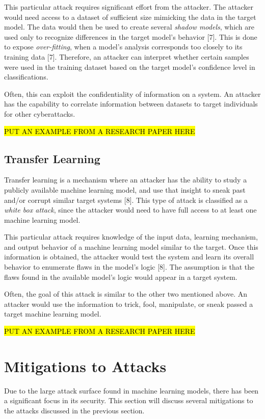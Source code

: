 \documentclass[11pt,conference]{IEEEtran}
\begin{document}
This particular attack requires significant effort from the attacker.
The attacker would need access to a dataset of sufficient size mimicking the
data in the target model. The data would then be used to create several
\emph{shadow models}, which are used only to recognize differences
in the target model's behavior [7]. This is done to expose \emph{over-fitting}, when a model's analysis corresponds too
closely to its training data [7]. Therefore, an attacker can interpret whether
certain samples were used in the training dataset based on the target model's
confidence level in classifications.

Often, this can exploit the confidentiality of information on a system. An
attacker has the capability to correlate information between datasets to target
individuals for other cyberattacks.

\hl{PUT AN EXAMPLE FROM A RESEARCH PAPER HERE}

\subsection{Transfer Learning}
Transfer learning is a mechanism where an attacker has the ability to study a
publicly available machine learning model, and use that insight to sneak past
and/or corrupt similar target systems [8]. This type of attack is classified as a
\emph{white box attack}, since the attacker would need to have full access to
at least one machine learning model.

This particular attack requires knowledge of the
input data, learning mechanism, and output behavior of a machine learning model
similar to the target. Once this information is obtained, the attacker would
test the system and learn its overall behavior to enumerate flaws in the
model's logic [8]. The assumption is that the flaws found in the available model's
logic would appear in a target system.

Often, the goal of this attack is similar to the other two mentioned above. An
attacker would use the information to trick, fool, manipulate, or sneak passed
a target machine learning model.

\hl{PUT AN EXAMPLE FROM A RESEARCH PAPER HERE}

\section{Mitigations to Attacks}

Due to the large attack surface found in machine learning models, there has
been a significant focus in its security. This section will
discuss several mitigations to the attacks discussed in the previous
section. 
\end{document}
